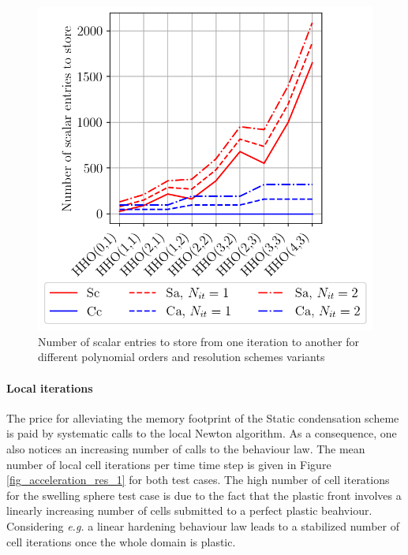\begin{figure}[H]
    \centering
    \includegraphics[width=8.cm]{../chapter_01_hho_mechanics/figures/plot_memory.png}
    \caption{Number of scalar entries to store from one iteration to another for different polynomial orders and resolution schemes variants}
    \label{fig_acceleration_res_memory}
\end{figure}

\paragraph{Local iterations}

The price for alleviating the memory footprint of the Static condensation scheme
is paid by systematic calls to the local Newton algorithm.
As a consequence, one also notices an increasing number of calls to the behaviour law.
The mean number of local cell iterations per time time step is given in Figure \ref{fig_acceleration_res_1} for both test cases. The high number of cell iterations for the swelling sphere test case is
due to the fact that the plastic front involves a linearly increasing number of cells submitted to a perfect plastic beahviour.
Considering \textit{e.g.} a linear hardening behaviour law leads to a stabilized number of cell iterations once the whole domain is plastic.

